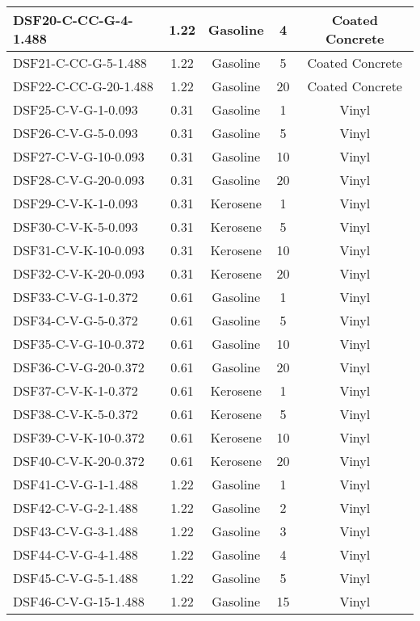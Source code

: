 \begin{table}[p]
\begin{center}
\begin{tabular}{|l|c|c|c|c|}
DSF20-C-CC-G-4-1.488   & 1.22  & Gasoline  & 4  & Coated Concrete   \\ \hline
DSF21-C-CC-G-5-1.488   & 1.22  & Gasoline  & 5  & Coated Concrete   \\ \hline
DSF22-C-CC-G-20-1.488  & 1.22  & Gasoline  & 20 & Coated Concrete   \\ \hline
DSF25-C-V-G-1-0.093    & 0.31  & Gasoline  & 1  & Vinyl             \\ \hline
DSF26-C-V-G-5-0.093    & 0.31  & Gasoline  & 5  & Vinyl             \\ \hline
DSF27-C-V-G-10-0.093   & 0.31  & Gasoline  & 10 & Vinyl             \\ \hline
DSF28-C-V-G-20-0.093   & 0.31  & Gasoline  & 20 & Vinyl             \\ \hline
DSF29-C-V-K-1-0.093    & 0.31  & Kerosene  & 1  & Vinyl             \\ \hline
DSF30-C-V-K-5-0.093    & 0.31  & Kerosene  & 5  & Vinyl             \\ \hline
DSF31-C-V-K-10-0.093   & 0.31  & Kerosene  & 10 & Vinyl             \\ \hline
DSF32-C-V-K-20-0.093   & 0.31  & Kerosene  & 20 & Vinyl             \\ \hline
DSF33-C-V-G-1-0.372    & 0.61  & Gasoline  & 1  & Vinyl             \\ \hline
DSF34-C-V-G-5-0.372    & 0.61  & Gasoline  & 5  & Vinyl             \\ \hline
DSF35-C-V-G-10-0.372   & 0.61  & Gasoline  & 10 & Vinyl             \\ \hline
DSF36-C-V-G-20-0.372   & 0.61  & Gasoline  & 20 & Vinyl             \\ \hline
DSF37-C-V-K-1-0.372    & 0.61  & Kerosene  & 1  & Vinyl             \\ \hline
DSF38-C-V-K-5-0.372    & 0.61  & Kerosene  & 5  & Vinyl             \\ \hline
DSF39-C-V-K-10-0.372   & 0.61  & Kerosene  & 10 & Vinyl             \\ \hline
DSF40-C-V-K-20-0.372   & 0.61  & Kerosene  & 20 & Vinyl             \\ \hline
DSF41-C-V-G-1-1.488    & 1.22  & Gasoline  & 1  & Vinyl             \\ \hline
DSF42-C-V-G-2-1.488    & 1.22  & Gasoline  & 2  & Vinyl             \\ \hline
DSF43-C-V-G-3-1.488    & 1.22  & Gasoline  & 3  & Vinyl             \\ \hline
DSF44-C-V-G-4-1.488    & 1.22  & Gasoline  & 4  & Vinyl             \\ \hline
DSF45-C-V-G-5-1.488    & 1.22  & Gasoline  & 5  & Vinyl             \\ \hline
DSF46-C-V-G-15-1.488   & 1.22  & Gasoline  & 15 & Vinyl             \\ \hline
\end{tabular}
\end{center}
\label{DoJ_HAI_Matrix}
\end{table}

